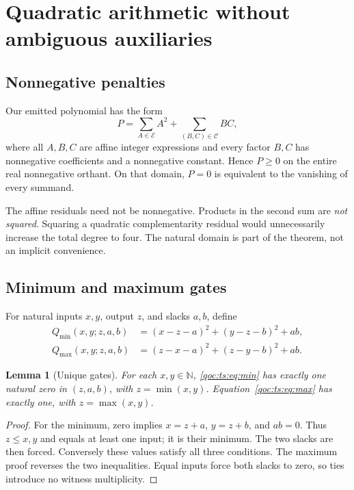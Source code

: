 \documentclass[11pt,letterpaper]{article}
\newtheorem{lemma}[theorem]{Lemma}
\theoremstyle{definition}
\theoremstyle{remark}
\newcommand{\N}{\mathbb N}
\newcommand{\eqres}{\mathcal E}
\newcommand{\prodres}{\mathcal C}
\newcommand{\minpen}{Q_{\min}}
\newcommand{\maxpen}{Q_{\max}}
\begin{document}
\section{Quadratic arithmetic without ambiguous auxiliaries}
\subsection{Nonnegative penalties}
Our emitted polynomial has the form
\begin{equation}\label{qoc:ts:eq:form}
 P=\sum_{A\in\eqres} A^2+\sum_{(B,C)\in\prodres}BC,
\end{equation}
where all $A,B,C$ are affine integer expressions and every factor $B,C$
has nonnegative coefficients and a nonnegative constant. Hence $P\ge0$
on the entire real nonnegative orthant. On that domain, $P=0$ is equivalent
to the vanishing of every summand.

The affine residuals need not be nonnegative. Products in the second sum
are \emph{not squared}. Squaring a quadratic complementarity residual
would unnecessarily increase the total degree to four. The natural domain
is part of the theorem, not an implicit convenience.

\subsection{Minimum and maximum gates}
For natural inputs $x,y$, output $z$, and slacks $a,b$, define
\begin{align}
 \minpen(x,y;z,a,b)&=(x-z-a)^2+(y-z-b)^2+ab,\label{qoc:ts:eq:min}\\
 \maxpen(x,y;z,a,b)&=(z-x-a)^2+(z-y-b)^2+ab.\label{qoc:ts:eq:max}
\end{align}

\begin{lemma}[Unique gates]\label{qoc:ts:lem:gates}
For each $x,y\in\N$, \eqref{qoc:ts:eq:min} has exactly one natural zero in
$(z,a,b)$, with $z=\min(x,y)$. Equation~\eqref{qoc:ts:eq:max} has exactly one,
with $z=\max(x,y)$.
\end{lemma}
\begin{proof}
For the minimum, zero implies $x=z+a$, $y=z+b$, and $ab=0$.
Thus $z\le x,y$ and equals at least one input; it is their minimum.
The two slacks are then forced. Conversely these values satisfy all
three conditions. The maximum proof reverses the two inequalities.
Equal inputs force both slacks to zero, so ties introduce no witness
multiplicity.
\end{proof}
\end{document}
